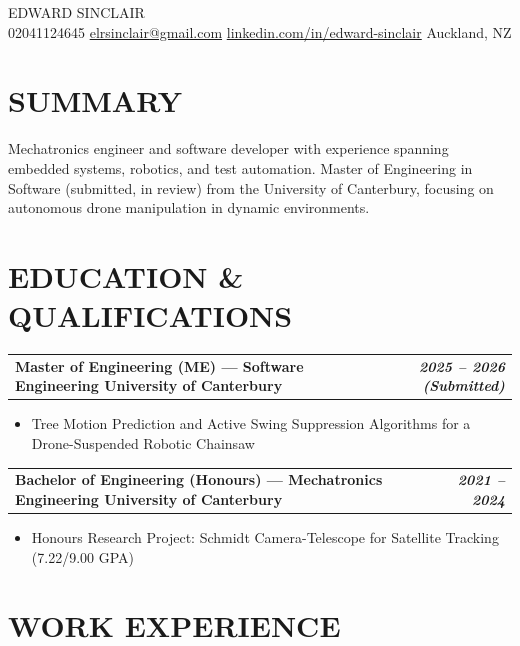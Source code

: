 \documentclass[11pt, a4paper]{article}
\makeatletter
\newcommand{\cventry}[2]{%
  \vspace{2pt}%
  \noindent
  \begin{tabularx}{\linewidth}{@{}X r@{}}
    \textbf{#1} & \textbf{\textit{#2}}
  \end{tabularx}%
  \vspace{1pt}%
}
\makeatother
\begin{document}
\begin{center}
  {\Huge\color{accent} EDWARD SINCLAIR}\\[4pt]
  \small\textcolor{footergray}{
  02041124645
  \textbar{}
  \href{mailto:elrsinclair@gmail.com}{elrsinclair@gmail.com}
  \textbar{}
  \href{https://www.linkedin.com/in/edward-sinclair/}{linkedin.com/in/edward-sinclair}
  \textbar{}
  Auckland, NZ}
\end{center}

\section{SUMMARY}

Mechatronics engineer and software developer with experience spanning embedded systems,
robotics, and test automation. Master of Engineering in Software (submitted, in review)
from the University of Canterbury, focusing on autonomous drone manipulation in dynamic
environments.

\section{EDUCATION \& QUALIFICATIONS}

\cventry{Master of Engineering (ME) — Software Engineering
         \textbar{} University of Canterbury}{2025 – 2026 (Submitted)}
\begin{itemize}
  \item Tree Motion Prediction and Active Swing Suppression Algorithms for a
        Drone-Suspended Robotic Chainsaw
\end{itemize}

\cventry{Bachelor of Engineering (Honours) — Mechatronics Engineering
         \textbar{} University of Canterbury}{2021 – 2024}
\begin{itemize}
  \item Honours Research Project: Schmidt Camera-Telescope for Satellite Tracking
        (7.22/9.00 GPA)
\end{itemize}

\section{WORK EXPERIENCE}
\end{document}
